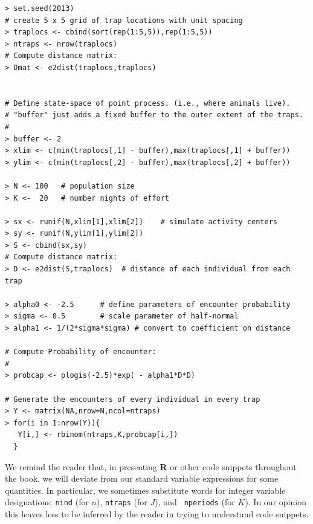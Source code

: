{\small
\begin{verbatim}
> set.seed(2013)
# create 5 x 5 grid of trap locations with unit spacing
> traplocs <- cbind(sort(rep(1:5,5)),rep(1:5,5))
> ntraps <- nrow(traplocs)
# Compute distance matrix:
> Dmat <- e2dist(traplocs,traplocs)


# Define state-space of point process. (i.e., where animals live).
# "buffer" just adds a fixed buffer to the outer extent of the traps.
#
> buffer <- 2
> xlim <- c(min(traplocs[,1] - buffer),max(traplocs[,1] + buffer))
> ylim <- c(min(traplocs[,2] - buffer),max(traplocs[,2] + buffer))

> N <- 100   # population size
> K <-  20   # number nights of effort

> sx <- runif(N,xlim[1],xlim[2])    # simulate activity centers
> sy <- runif(N,ylim[1],ylim[2])
> S <- cbind(sx,sy)
# Compute distance matrix:
> D <- e2dist(S,traplocs)  # distance of each individual from each trap

> alpha0 <- -2.5      # define parameters of encounter probability
> sigma <- 0.5        # scale parameter of half-normal
> alpha1 <- 1/(2*sigma*sigma) # convert to coefficient on distance

# Compute Probability of encounter:
#
> probcap <- plogis(-2.5)*exp( - alpha1*D*D)    

# Generate the encounters of every individual in every trap
> Y <- matrix(NA,nrow=N,ncol=ntraps)
> for(i in 1:nrow(Y)){
   Y[i,] <- rbinom(ntraps,K,probcap[i,])
  }
\end{verbatim}
}
We remind the reader that, in presenting {\bf R} or other code snippets
throughout the book, we will deviate from our standard variable
expressions for some quantities.
In particular, we sometimes
substitute words for integer variable designations:
\mbox{\tt nind} (for $n$), \mbox{\tt ntraps} (for $J$), and \mbox{\tt
 nperiods} (for $K$). In our opinion this leaves less to be inferred
by the reader in trying to understand code snippets.

